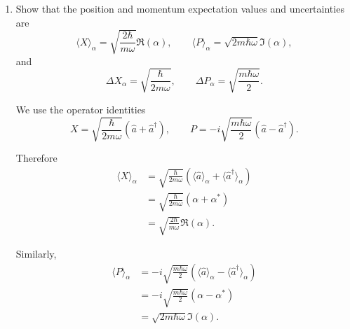 \documentclass[11pt,a4paper]{scrartcl}
\begin{document}
\begin{enumerate}[label=(\alph*)]
\begin{calculationbox}
    The relative energy fluctuation behaves as
    \[
    \frac{\Delta H_\alpha}{\langle H\rangle_\alpha}
    = \frac{|\alpha|}{|\alpha|^2+\frac12}
    \sim \frac{1}{|\alpha|}
    \qquad (|\alpha|\gg 1),
    \]
    so it vanishes in the quasi-classical limit.
    \end{calculationbox}

    \begin{answerbox}
    \[
    \boxed{
    \langle H\rangle_\alpha = \hbar\omega\left(|\alpha|^2+\frac12\right),
    \qquad
    \Delta H_\alpha = \hbar\omega |\alpha|.
    }
    \]
    \end{answerbox}

    \item Show that the position and momentum expectation values and uncertainties are
    \[
    \langle X\rangle_\alpha = \sqrt{\frac{2\hbar}{m\omega}}\Re(\alpha),
    \qquad
    \langle P\rangle_\alpha = \sqrt{2m\hbar\omega}\Im(\alpha),
    \]
    and
    \[
    \Delta X_\alpha=\sqrt{\frac{\hbar}{2m\omega}},
    \qquad
    \Delta P_\alpha=\sqrt{\frac{m\hbar\omega}{2}}.
    \]

    \begin{calculationbox}
    We use the operator identities
    \[
    X=\sqrt{\frac{\hbar}{2m\omega}}(\hat a+\hat a^\dagger),
    \qquad
    P=-i\sqrt{\frac{m\hbar\omega}{2}}(\hat a-\hat a^\dagger).
    \]

    Therefore
    \begin{align*}
        \langle X\rangle_\alpha
        &= \sqrt{\frac{\hbar}{2m\omega}}
        \left(\langle \hat a\rangle_\alpha + \langle \hat a^\dagger\rangle_\alpha\right) \\
        &= \sqrt{\frac{\hbar}{2m\omega}}(\alpha+\alpha^*) \\
        &= \sqrt{\frac{2\hbar}{m\omega}}\Re(\alpha).
    \end{align*}

    Similarly,
    \begin{align*}
        \langle P\rangle_\alpha
        &= -i\sqrt{\frac{m\hbar\omega}{2}}
        \left(\langle \hat a\rangle_\alpha - \langle \hat a^\dagger\rangle_\alpha\right) \\
        &= -i\sqrt{\frac{m\hbar\omega}{2}}(\alpha-\alpha^*) \\
        &= \sqrt{2m\hbar\omega}\Im(\alpha).
    \end{align*}


\end{calculationbox}
\end{enumerate}
\end{document}
